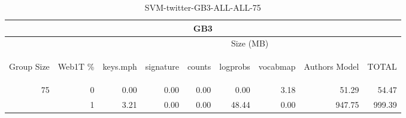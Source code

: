 \begin{center}
\begin{table}[htbp] 
 \begin{center}
\begin{tabular}{ | r | r | r | r | r | r | r | r | r |}
\hline
\multicolumn{9}{|c|}{GB3}\\
\hline
 & & \multicolumn{7}{|c|}{Size (MB)}\\ \cline{3-9}
\begin{sideways}Group Size\end{sideways} & \begin{sideways}Web1T \% \end{sideways} & \begin{sideways}keys.mph\end{sideways} & \begin{sideways}signature\end{sideways} & \begin{sideways}counts\end{sideways} & \begin{sideways}logprobs\end{sideways} & \begin{sideways}vocabmap\end{sideways} & \begin{sideways}Authors Model \end{sideways} & \begin{sideways}TOTAL\end{sideways}\\
\hline
\multirow{1}{*}{75}
 & 0 & 0.00 & 0.00 & 0.00 & 0.00 & 3.18 & 51.29 & 54.47\\ \cline{2-9}
 & 1 & 3.21 & 0.00 & 0.00 & 48.44 & 0.00 & 947.75 & 999.39\\ \cline{2-9}
\hline
\end{tabular}
\caption{SVM-twitter-GB3-ALL-ALL-75}
\label{table:SVM-twitter-GB3-ALL-ALL-75}
\end{center}
 \end{table}
\end{center}

